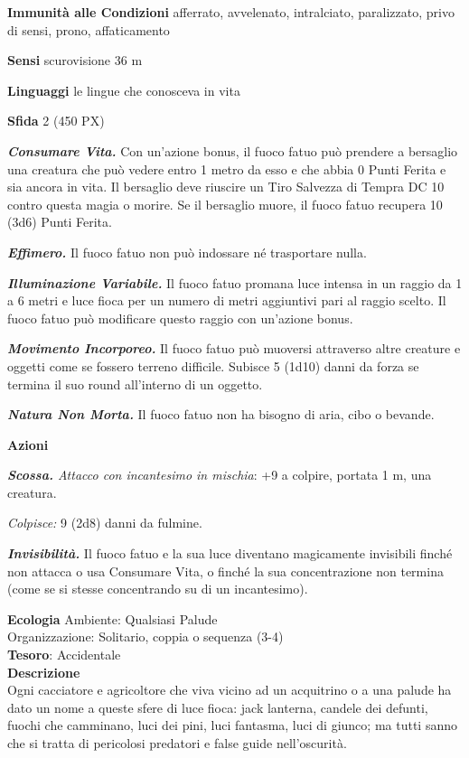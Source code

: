 \begin{multicols}{2}
	\textbf{Immunità alle Condizioni} afferrato, avvelenato, intralciato, paralizzato, privo di sensi, prono, affaticamento

	\textbf{Sensi} scurovisione 36 m

	\textbf{Linguaggi} le lingue che conosceva in vita

	\textbf{Sfida} 2 (450 PX)

	\textit{\textbf{Consumare Vita.}} Con un'azione bonus, il fuoco fatuo può prendere a bersaglio una creatura che può vedere entro 1 metro da esso e che abbia 0 Punti Ferita e sia ancora in vita. Il bersaglio deve riuscire un Tiro Salvezza di Tempra DC 10 contro questa magia o morire. Se il bersaglio muore, il fuoco fatuo recupera 10 (3d6) Punti Ferita.

	\textit{\textbf{Effimero.}} Il fuoco fatuo non può indossare né trasportare nulla.

	\textit{\textbf{Illuminazione Variabile.}} Il fuoco fatuo promana luce intensa in un raggio da 1 a 6 metri e luce fioca per un numero di metri aggiuntivi pari al raggio scelto. Il fuoco fatuo può modificare questo raggio con un'azione bonus.

	\textit{\textbf{Movimento Incorporeo.}} Il fuoco fatuo può muoversi attraverso altre creature e oggetti come se fossero terreno difficile. Subisce 5 (1d10) danni da forza se termina il suo round all'interno di un oggetto.

	\textit{\textbf{Natura Non Morta.}} Il fuoco fatuo non ha bisogno di aria, cibo o bevande.

	\textbf{Azioni}

	\textit{\textbf{Scossa.} Attacco con incantesimo in mischia}: +9 a colpire, portata 1 m, una creatura.

	\textit{Colpisce:} 9 (2d8) danni da fulmine.

	\textit{\textbf{Invisibilità.}} Il fuoco fatuo e la sua luce diventano magicamente invisibili finché non attacca o usa Consumare Vita, o finché la sua concentrazione non termina (come se si stesse concentrando su di un incantesimo).

	\textbf{Ecologia}
	Ambiente: Qualsiasi Palude\\
	Organizzazione: Solitario, coppia o sequenza (3-4)\\
	\textbf{Tesoro}: Accidentale\\
	\textbf{Descrizione}\\
	Ogni cacciatore e agricoltore che viva vicino ad un acquitrino o a una palude ha dato un nome a queste sfere di luce fioca: jack lanterna, candele dei defunti, fuochi che camminano, luci dei pini, luci fantasma, luci di giunco; ma tutti sanno che si tratta di pericolosi predatori e false guide nell'oscurità.


\end{multicols}
